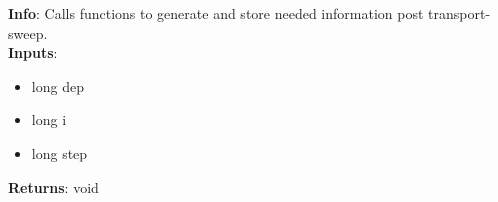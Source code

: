 \textbf{Info}: Calls functions to generate and store needed information
post transport-sweep. \\

\noindent \textbf{Inputs}:
\begin{itemize}
\item{long dep}
\item{long i}
\item{long step}
\end{itemize}

\noindent \textbf{Returns}: void
